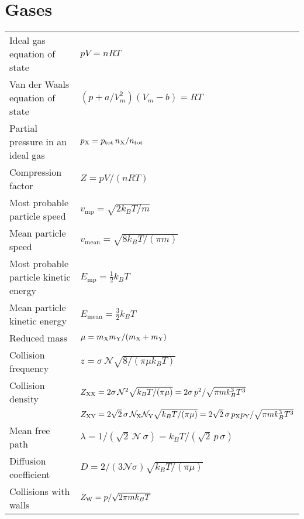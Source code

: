 \documentclass[a4paper, 11pt]{article}
\makeatletter
\newenvironment{explain}{\color{explain}\def\arraystretch{1.6}\setlength{\tabcolsep}{.05\textwidth}\begin{longtable}{@{}p{.35\textwidth}p{.55\textwidth}}\raggedright}{\end{longtable}}
\makeatother
\begin{document}
\section*{Gases}
\begin{explain}Ideal gas equation of state & $pV=nRT$
\\
Van der Waals equation of state & $\left(p+a/V_m^2\right)\left(V_m-b\right)=RT$
\\
Partial pressure in an ideal gas & $p_{\text X} = p_{\text{tot}}\, n_{\text X}/n_{\text{tot}} $
\\
Compression factor &$Z=pV/(nRT)$
\\
Most probable particle speed & $v_{\text{mp}} = \sqrt{2k_B T/m}$
\\
Mean particle speed & $v_{\text{mean}} = \sqrt{8k_B T/(\pi m)}$
\\
Most probable particle kinetic energy & $E_{\text{mp}} = \frac12 k_B T$
\\
Mean particle kinetic energy & $E_{\text{mean}} = \frac32 k_B T$
\\
Reduced mass & $\mu=m_{\text X} m_{\text Y} / (m_{\text X} +m_{\text Y} )$
\\
Collision frequency & $z=\sigma\,\mathcal{N}\sqrt{8/(\pi\mu k_B T)}$
\\
Collision density & $Z_{\text X \text X}=2\sigma\,\mathcal{N}^2\sqrt{k_B T/(\pi\mu )}=2\sigma\,p^2/\sqrt{\pi m k_B^3 T^3}$
\\
& $Z_{\text X \text Y}=2\sqrt 2\,\sigma\,\mathcal{N}_{\text X} \mathcal{N}_{\text Y} \sqrt{k_B T/(\pi\mu )}=2\sqrt 2\,\sigma\,p_{\text X}p_{\text Y}/\sqrt{\pi m k_B^3 T^3}$
\\
Mean free path & $\lambda = 1/\left(\sqrt2\,\mathcal N\,\sigma\right)=k_B T/\left(\sqrt2\,p\,\sigma\right)$
\\
Diffusion coefficient & $D=2/\left(3\mathcal N \sigma\right)\sqrt{k_B T/(\pi\mu)}$
\\
Collisions with walls & $Z_{\text W}=p/\sqrt{2\pi m k_B T}$
\end{explain}
\end{document}
